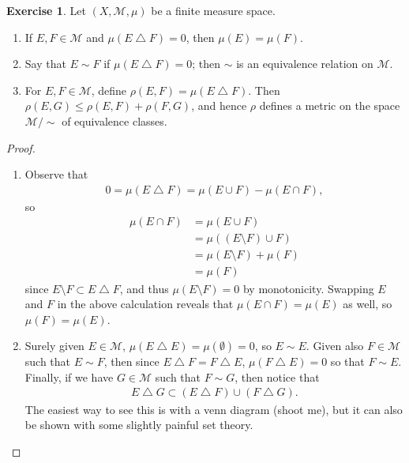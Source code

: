 \documentclass{article}
\theoremstyle{definition}
\newtheorem{ex}{Exercise}
\begin{document}
\begin{ex}
	Let $(X, \mathscr{M}, \mu)$ be a finite measure space.
	\begin{enumerate}[label=\textbf{\alph*.}]
		\item If $E, F \in \mathscr{M}$ and $\mu(E \bigtriangleup F) = 0$, then $\mu(E) = \mu(F)$.
		\item Say that $E \sim F$ if $\mu(E \bigtriangleup F) = 0$; then $\sim$ is an equivalence relation on $\mathscr{M}$.
		\item For $E, F \in \mathscr{M}$, define $\rho (E, F) = \mu(E \bigtriangleup F)$.
		      Then $\rho(E, G) \leq \rho(E, F) + \rho(F, G)$, and hence $\rho$ defines a metric on the space $\mathscr{M} / \sim$ of equivalence classes.
	\end{enumerate}
\end{ex}
\begin{proof}\
	\begin{enumerate}[label=\textbf{\alph*.}]
		\item Observe that \begin{align*}
			      0 = \mu(E \bigtriangleup F) = \mu(E \cup F) - \mu(E \cap F),
		      \end{align*}
		      so \begin{align*}
			      \mu(E \cap F) & = \mu(E \cup F)               \\
			                    & = \mu((E \setminus F) \cup F) \\
			                    & = \mu(E \setminus F) + \mu(F) \\
			                    & = \mu (F)
		      \end{align*}
		      since $E \setminus F \subset E \bigtriangleup F$, and thus $\mu (E \setminus F) = 0$ by monotonicity.
		      Swapping $E$ and $F$ in the above calculation reveals that $\mu(E \cap F) = \mu(E)$ as well, so $\mu(F) = \mu(E)$.
		\item Surely given $E \in \mathscr{M}$, $\mu(E \bigtriangleup E) = \mu(\emptyset) = 0$, so $E \sim E$.
		      Given also $F \in \mathscr{M}$ such that $E \sim F$, then since $E \bigtriangleup F = F \bigtriangleup E$, $\mu(F \bigtriangleup E) = 0$ so that $F \sim E$.
		      Finally, if we have $G \in \mathscr{M}$ such that $F \sim G$, then notice that \begin{align*}
			      E \bigtriangleup G \subset (E \bigtriangleup F) \cup (F \bigtriangleup G).
		      \end{align*}
		      The easiest way to see this is with a venn diagram (shoot me), but it can also be shown with some slightly painful set theory.

\end{enumerate}
\end{proof}
\end{document}
